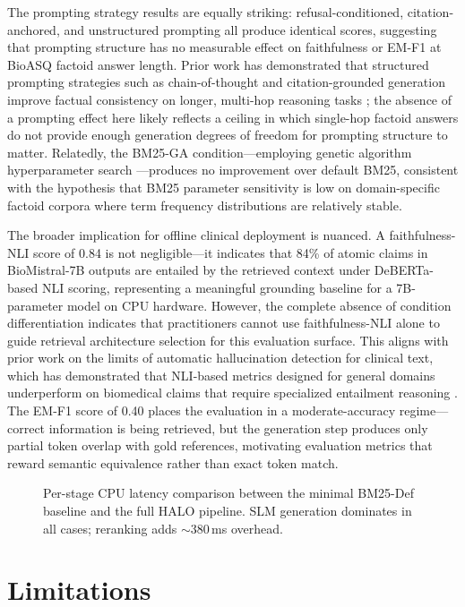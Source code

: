 \documentclass{article}
\begin{document}
The prompting strategy results are equally striking: refusal-conditioned, citation-anchored, and unstructured prompting all produce identical scores, suggesting that prompting structure has no measurable effect on faithfulness or EM-F1 at BioASQ factoid answer length. Prior work has demonstrated that structured prompting strategies such as chain-of-thought and citation-grounded generation improve factual consistency on longer, multi-hop reasoning tasks \cite{liu2022pretrain}; the absence of a prompting effect here likely reflects a ceiling in which single-hop factoid answers do not provide enough generation degrees of freedom for prompting structure to matter. Relatedly, the BM25-GA condition---employing genetic algorithm hyperparameter search \cite{katoch2020review}---produces no improvement over default BM25, consistent with the hypothesis that BM25 parameter sensitivity is low on domain-specific factoid corpora where term frequency distributions are relatively stable.

The broader implication for offline clinical deployment is nuanced. A faithfulness-NLI score of 0.84 is not negligible---it indicates that 84\% of atomic claims in BioMistral-7B outputs are entailed by the retrieved context under DeBERTa-based NLI scoring, representing a meaningful grounding baseline for a 7B-parameter model on CPU hardware. However, the complete absence of condition differentiation indicates that practitioners cannot use faithfulness-NLI alone to guide retrieval architecture selection for this evaluation surface. This aligns with prior work on the limits of automatic hallucination detection for clinical text, which has demonstrated that NLI-based metrics designed for general domains underperform on biomedical claims that require specialized entailment reasoning \cite{ecker2022psychological}. The EM-F1 score of 0.40 places the evaluation in a moderate-accuracy regime---correct information is being retrieved, but the generation step produces only partial token overlap with gold references, motivating evaluation metrics that reward semantic equivalence rather than exact token match.

\begin{figure}[t]
\centering

\caption{Per-stage CPU latency comparison between the minimal BM25-Def baseline and the full HALO pipeline. SLM generation dominates in all cases; reranking adds $\sim$380\,ms overhead.}
\label{fig:latency}
\end{figure}

\section{Limitations}
\end{document}
